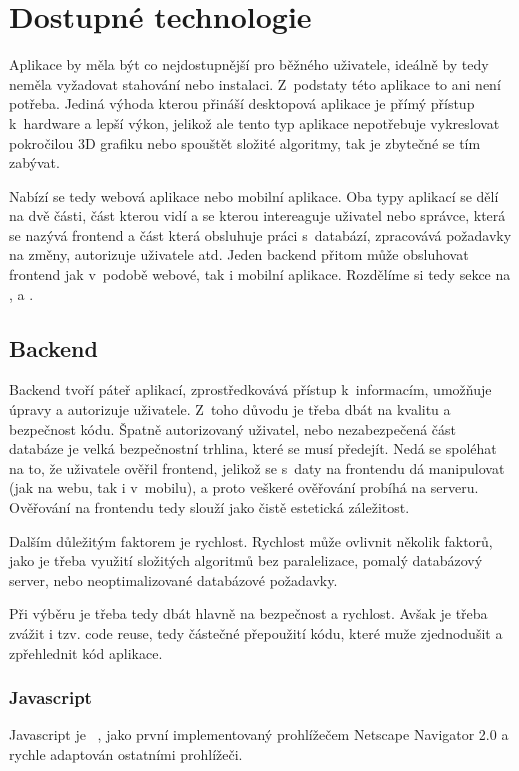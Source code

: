 \section{Dostupné technologie}
\label{sc:available_technologies}
Aplikace by měla být co nejdostupnější pro běžného uživatele, ideálně by tedy neměla vyžadovat stahování nebo instalaci. Z~podstaty této aplikace to ani není potřeba. Jediná výhoda kterou přináší desktopová aplikace je přímý přístup k~hardware a lepší výkon, jelikož ale tento typ aplikace nepotřebuje vykreslovat pokročilou 3D grafiku nebo spouštět složité algoritmy, tak je zbytečné se tím zabývat.

Nabízí se tedy webová aplikace nebo mobilní aplikace. Oba typy aplikací se dělí na dvě části, část kterou vidí a se kterou intereaguje uživatel nebo správce, která se nazývá frontend a část která obsluhuje práci s~databází, zpracovává požadavky na změny, autorizuje uživatele atd. Jeden backend přitom může obsluhovat frontend jak v~podobě webové, tak i mobilní aplikace. Rozdělíme si tedy sekce na ,  a .

\subsection{Backend}
\label{ss:backend}
Backend tvoří páteř aplikací, zprostředkovává přístup k~informacím, umožňuje úpravy a autorizuje uživatele. Z~toho důvodu je třeba dbát na kvalitu a bezpečnost kódu. Špatně autorizovaný uživatel, nebo nezabezpečená část databáze je velká bezpečnostní trhlina, které se musí předejít. Nedá se spoléhat na to, že uživatele ověřil frontend, jelikož se s~daty na frontendu dá manipulovat (jak na webu, tak i v~mobilu), a proto veškeré ověřování probíhá na serveru. Ověřování na frontendu tedy slouží jako čistě estetická záležitost.

Dalším důležitým faktorem je rychlost. Rychlost může ovlivnit několik faktorů, jako je třeba využití složitých algoritmů bez paralelizace, pomalý databázový server, nebo neoptimalizované databázové požadavky.

Při výběru je třeba tedy dbát hlavně na bezpečnost a rychlost. Avšak je třeba zvážit i tzv. code reuse, tedy částečné přepoužití kódu, které muže zjednodušit a zpřehlednit kód aplikace.

\subsubsection*{Javascript}
Javascript je \emph{}~\cite{netscapecommunicationscorporation_1995_press}, jako první implementovaný prohlížečem Netscape Navigator 2.0 a rychle adaptován ostatními prohlížeči.

